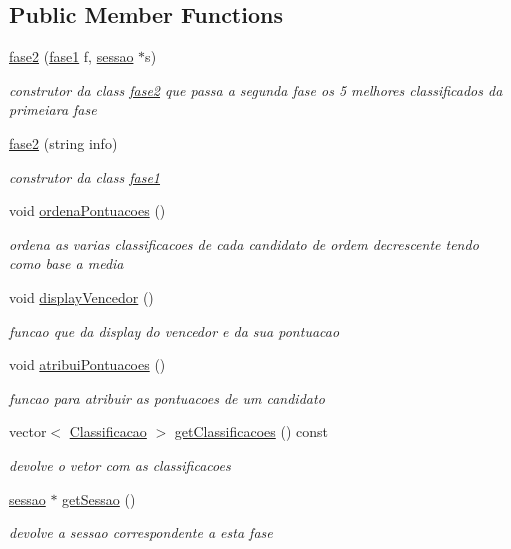 \subsection*{Public Member Functions}
\begin{DoxyCompactItemize}
\item 
\hyperlink{classfase2_a35257f931f3c049ce109f8420a4947ce}{fase2} (\hyperlink{classfase1}{fase1} f, \hyperlink{classsessao}{sessao} $\ast$s)
\begin{DoxyCompactList}\small\item\em construtor da class \hyperlink{classfase2}{fase2} que passa a segunda fase os 5 melhores classificados da primeiara fase \end{DoxyCompactList}\item 
\hyperlink{classfase2_a50efc3d5d2b81385069e7db490088dd4}{fase2} (string info)
\begin{DoxyCompactList}\small\item\em construtor da class \hyperlink{classfase1}{fase1} \end{DoxyCompactList}\item 
void \hyperlink{classfase2_a072c622b806ec59bedf3588a5886a153}{ordena\+Pontuacoes} ()
\begin{DoxyCompactList}\small\item\em ordena as varias classificacoes de cada candidato de ordem decrescente tendo como base a media \end{DoxyCompactList}\item 
void \hyperlink{classfase2_a53f1281d38b661b21ec3954b41ea4945}{display\+Vencedor} ()
\begin{DoxyCompactList}\small\item\em funcao que da display do vencedor e da sua pontuacao \end{DoxyCompactList}\item 
void \hyperlink{classfase2_a8088339c7740a9bdb0d26c270036a885}{atribui\+Pontuacoes} ()
\begin{DoxyCompactList}\small\item\em funcao para atribuir as pontuacoes de um candidato \end{DoxyCompactList}\item 
vector$<$ \hyperlink{structClassificacao}{Classificacao} $>$ \hyperlink{classfase2_a9ce60146eeac9f5862e1eb5c87191418}{get\+Classificacoes} () const 
\begin{DoxyCompactList}\small\item\em devolve o vetor com as classificacoes \end{DoxyCompactList}\item 
\hyperlink{classsessao}{sessao} $\ast$ \hyperlink{classfase2_acef38bb05864322911031659dab18adf}{get\+Sessao} ()
\begin{DoxyCompactList}\small\item\em devolve a sessao correspondente a esta fase \end{DoxyCompactList}\end{DoxyCompactItemize}

